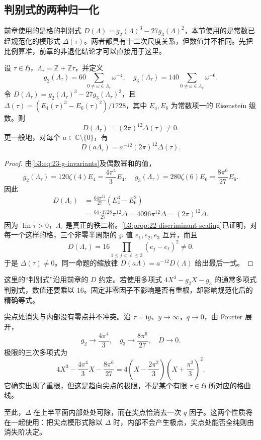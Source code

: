 \subsection{判别式的两种归一化}
\label{b3:subsec:230404}

前章使用的是格的判别式 \(D(\Lambda)=g_2(\Lambda)^3-27g_3(\Lambda)^2\)，本节使用的是常数已经规范化的模形式 \(\Delta(\tau)\)。两者都具有十二次尺度关系，但数值并不相同。先把比例算准，前章的非退化结论才可以直接用于这里。

\begin{proposition}[格判别式与模判别式]\label{b3:prop:23-delta-nonvanishing}
设 \(\tau\in\mathfrak H\)，\(\Lambda_\tau=\mathbb Z+\mathbb Z\tau\)，并定义
\[
 g_2(\Lambda_\tau)=60\sum_{0\ne\omega\in\Lambda_\tau}\omega^{-4},
 \quad
 g_3(\Lambda_\tau)=140\sum_{0\ne\omega\in\Lambda_\tau}\omega^{-6}.
\]
令 \(D(\Lambda_\tau)=g_2(\Lambda_\tau)^3-27g_3(\Lambda_\tau)^2\)，且
\(\Delta(\tau)=(E_4(\tau)^3-E_6(\tau)^2)/1728\)，其中 \(E_4,E_6\) 为常数项一的 Eisenstein 级数。则
\begin{equation}\label{b3:eq:23-discriminant-normalization}
 D(\Lambda_\tau)=(2\pi)^{12}\Delta(\tau)\ne0.
\end{equation}
更一般地，对每个 \(a\in\mathbb C\setminus\{0\}\)，有
\[
 D(a\Lambda_\tau)=a^{-12}(2\pi)^{12}\Delta(\tau).
\]
\end{proposition}
\begin{proof}
由\eqref{b3:eq:23-g-invariants}及偶数幂和的值，
\[
 g_2(\Lambda_\tau)
 =120\zeta(4)E_4=\frac{4\pi^4}{3}E_4,\quad
 g_3(\Lambda_\tau)
 =280\zeta(6)E_6=\frac{8\pi^6}{27}E_6.
\]
因此
\[
 \begin{aligned}
 D(\Lambda_\tau)
 &=\frac{64\pi^{12}}{27}\left(E_4^3-E_6^2\right)\\
 &=\frac{64\cdot1728}{27}\pi^{12}\Delta
  =4096\pi^{12}\Delta=(2\pi)^{12}\Delta.
 \end{aligned}
\]
因为 \(\operatorname{Im}\tau>0\)，\(\Lambda_\tau\) 是真正的秩二格。\cref{b3:prop:22-discriminant-scaling}已证明，对每一个这样的格，三个非零半周期的 \(\wp\) 值 \(e_1,e_2,e_3\) 互异，而且
\[
 D(\Lambda_\tau)=16\prod_{1\le j<\ell\le3}(e_j-e_\ell)^2\ne0.
\]
于是 \(\Delta(\tau)\ne0\)。同一命题的缩放律 \(D(a\Lambda)=a^{-12}D(\Lambda)\) 给出最后一式。
\end{proof}

这里的“判别式”沿用前章的 \(D\) 约定。若使用多项式 \(4X^3-g_2X-g_3\) 的通常多项式判别式，数值还要乘以 \(16\)。固定非零因子不影响是否有重根，却影响规范化后的精确等式。

\ProseParagraphBreak

尖点处消失与内部没有零点并不冲突。沿 \(\tau=\mathrm{i}y\)、\(y\to\infty\)，\(q\to0\)，由 Fourier 展开，
\[
 g_2\longrightarrow\frac{4\pi^4}{3},\quad
 g_3\longrightarrow\frac{8\pi^6}{27},\quad D\longrightarrow0.
\]
极限的三次多项式为
\[
 4X^3-\frac{4\pi^4}{3}X-\frac{8\pi^6}{27}
 =4\left(X-\frac{2\pi^2}{3}\right)
    \left(X+\frac{\pi^2}{3}\right)^2.
\]
它确实出现了重根，但这是趋向尖点的极限，不是某个有限 \(\tau\in\mathfrak H\) 所对应的格曲线。

\ProseParagraphBreak

至此，\(\Delta\) 在上半平面内部处处可除，而在尖点恰消去一次 \(q\) 因子。这两个性质将在一起使用：把尖点模形式除以 \(\Delta\) 时，内部不会产生极点，尖点处能否全纯则由消失阶决定。
